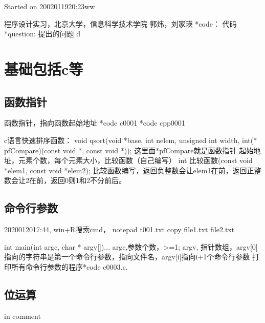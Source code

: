 \documentclass[UTF8]{article}
\begin{document}
Started on 2002011920:23ww

程序设计实习，北京大学，信息科学技术学院
郭炜，刘家瑛
*code： 代码
*question: 提出的问题
d

\section{基础包括c等}
\subsection{函数指针}
函数指针，指向函数起始地址
*code c0001
*code cpp0001

c语言快速排序函数：
void qsort(void *base, int nelem, unsigned int width, int(* pfCompare)(const void *, const void *));
这里面*pfCompare就是函数指针
起始地址，元素个数，每个元素大小，比较函数（自己编写）
int 比较函数(const void *elem1, const void *elem2);
比较函数编写，返回负整数会让elem1在前，返回正整数会让2在前，返回0则1和2不分前后。

\subsection{命令行参数}
2020012017:44,
win+R搜索cmd，
notepad t001.txt
copy file1.txt file2.txt

int main(int argc, char * argv[]){...}
argc,参数个数，>=1;
argv, 指针数组，argv[0]指向的字符串是第一个命令行参数，指向文件名，argv[i]指向i+1个命令行参数
打印所有命令行参数的程序*code c0003.c.

\subsection{位运算}
in comment
\begin{comment}
与&，双目,2个1才是1
21 & 18 = 16
某位清0，或提取变量某一位。
如将int低8位清0:
n = n & 0xffffff00;
n &= 0xffffff00;
对于short的n是 n &= 0xff00;
*question: 判断int右起从0开始第7位是否是1？
看n & 0x80 是不是0x80即可。
0x80 = 1000 0000 。


或|，双目,2个0才是0
21 | 18 = 23
某些位置1，保留其余不变，
如低8位变成1其余不变，
n |= 0xffffffea



非~，单目,
~21 = 0xff



异或^，双目, 不同时取1.
21 ^ 18 = 7
某些位取反，其余不变。
n ^= 0xff
1 1 0
0 0 0
1 0 1
0 1 1
发现 a^b=c,能得到b^c=a, c^a=b, 可用于加密解密，如用秘钥b加密a。
a b --c | a b -a
b c --a | b a -b
c a --b | a b -a
如以下可实现2个变量直接交换：
a ^= b;
b ^= a;
a ^= b;


<<左移，双目
a<<b = a*2^b
a左移b位，高位丢弃，低位补0


>>右移，双目
有符号位如long, int, short, char, 右移后左边补的数和符号位相同。
无符号的补0
往小取整
-25 >> 4 = -2
-2 >> 4 = -1
18 >> 4 = 1
*code c0004

*question: 2个int的a和n=[0,31],取a的第n位。
(a>>n) & 0x0001;
(a>>n) & 1;
或者： (a & (1<<n))>> n
\end{comment}
\end{document}
